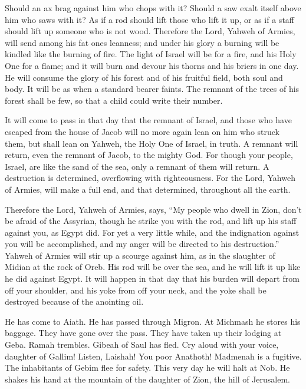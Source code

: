  Should an ax brag against him who chops with it? Should
a saw exalt itself above him who saws with it? As if a rod should lift
those who lift it up, or as if a staff should lift up someone who is not
wood.  Therefore the Lord, Yahweh of Armies, will send
among his fat ones leanness; and under his glory a burning will be
kindled like the burning of fire.  The light of Israel
will be for a fire, and his Holy One for a flame; and it will burn and
devour his thorns and his briers in one day.  He will
consume the glory of his forest and of his fruitful field, both soul and
body. It will be as when a standard bearer faints.  The
remnant of the trees of his forest shall be few, so that a child could
write their number.

 It will come to pass in that day that the remnant of
Israel, and those who have escaped from the house of Jacob will no more
again lean on him who struck them, but shall lean on Yahweh, the Holy
One of Israel, in truth.  A remnant will return, even the
remnant of Jacob, to the mighty God.  For though your
people, Israel, are like the sand of the sea, only a remnant of them
will return. A destruction is determined, overflowing with
righteousness.  For the Lord, Yahweh of Armies, will make
a full end, and that determined, throughout all the earth.

 Therefore the Lord, Yahweh of Armies, says, ``My people
who dwell in Zion, don't be afraid of the Assyrian, though he strike you
with the rod, and lift up his staff against you, as Egypt did.
 For yet a very little while, and the indignation against
you will be accomplished, and my anger will be directed to his
destruction.''  Yahweh of Armies will stir up a scourge
against him, as in the slaughter of Midian at the rock of Oreb. His rod
will be over the sea, and he will lift it up like he did against Egypt.
 It will happen in that day that his burden will depart
from off your shoulder, and his yoke from off your neck, and the yoke
shall be destroyed because of the anointing oil.

 He has come to Aiath. He has passed through Migron. At
Michmash he stores his baggage.  They have gone over the
pass. They have taken up their lodging at Geba. Ramah trembles. Gibeah
of Saul has fled.  Cry aloud with your voice, daughter of
Gallim! Listen, Laishah! You poor Anathoth!  Madmenah is
a fugitive. The inhabitants of Gebim flee for safety. 
This very day he will halt at Nob. He shakes his hand at the mountain of
the daughter of Zion, the hill of Jerusalem.


